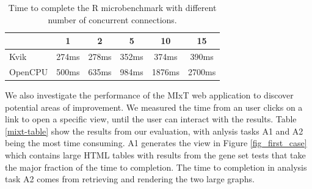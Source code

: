 \begin{table}[h]
    \begin{tabular}{| l | c | c | c | c | c | }
        \hline 
       & 1 & 2 & 5 & 10 & 15 \\ 
      \hline			
      Kvik & 274ms & 278ms & 352ms & 374ms & 390ms\\
      \hline
      OpenCPU & 500ms & 635ms & 984ms & 1876ms & 2700ms\\
      \hline  
    \end{tabular}
\caption[]{Time to complete the R microbenchmark with different number of
    concurrent 
connections.}
\label{kvikopencpucomparison}
\end{table} 

We also investigate the performance of the  MIxT web application to discover
potential areas of improvement. We measured the time from an user clicks on a
link to open a specific view, until the user can interact with the results.
Table \ref{mixt-table} show the results from our evaluation, with anlysis tasks
A1 and A2 being the most time consuming. A1 generates the view in
Figure \ref{fig_first_case} which contains large HTML tables with results from
the gene set tests that take the major fraction of the time to completion. The
time to completion in analysis task A2 comes from retrieving and rendering the
two large graphs. 

\begin{table}[h]
\caption[]{An overview of the number of calls to the compute service and
completion time before the results for the different analysis tasks are ready to
be explored. The number of calls and completion time for analysis task 6 depends
on the search query.}
\label{mixt-table}
\end{table} 






